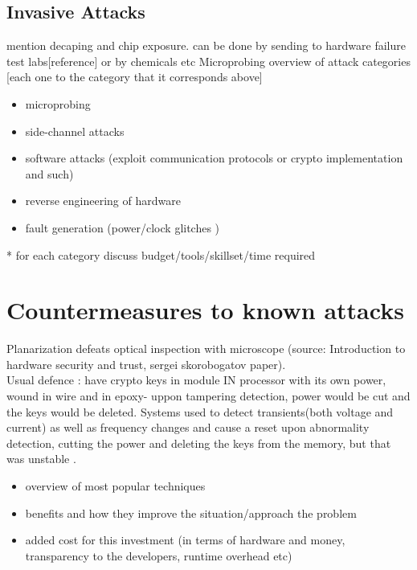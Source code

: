 \documentclass[10pt,a4paper,twocolumn]{article}
\begin{document}
	\subsection{Invasive Attacks}
	mention decaping and chip exposure. can be done by sending to hardware failure test labs[reference] or by chemicals etc \citep{anderson:cautionary_note}
	Microprobing
	overview of attack categories [each one to the category that it corresponds above]
	\begin{itemize}
		\item microprobing \\
		\item side-channel attacks \\
		\item software attacks (exploit communication protocols or crypto implementation and such) \\
		\item reverse engineering of hardware\\
		\item fault generation (power/clock glitches ) \\
	\end{itemize}
	
	* for each category discuss budget/tools/skillset/time required\\

\section{Countermeasures to known attacks}
\label{sec:defenses}

Planarization defeats optical inspection with microscope (source: Introduction to hardware security and trust, sergei skorobogatov paper).\\
Usual defence : have crypto keys in module IN processor with its own power, wound in wire and in epoxy- uppon tampering detection, power would be cut and the keys would be deleted. Systems used to detect transients(both voltage and current) as well as frequency changes and cause a reset upon abnormality detection, cutting the power and deleting the keys from the memory, but that was unstable \citep{anderson:cautionary_note}.
	\begin{itemize}
	\item overview of most popular techniques \\
	\item benefits and how they improve the situation/approach the problem
	\item added cost for this investment (in terms of hardware and money, transparency to the developers, runtime overhead etc)\\
	\end{itemize}
	
\end{document}
